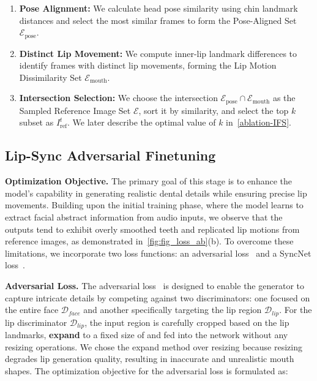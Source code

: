 \begin{enumerate}
\item \textbf{Pose Alignment:} We calculate head pose similarity using chin landmark distances and select the most similar frames to form the Pose-Aligned Set \(\mathcal{E}_{\text{pose}}\). 

\item \textbf{Distinct Lip Movement:} We compute inner-lip landmark differences to identify frames with distinct lip movements, forming the Lip Motion Dissimilarity Set \(\mathcal{E}_{\text{mouth}}\). 

\item \textbf{Intersection Selection:} We choose the intersection \(\mathcal{E}_{\text{pose}} \cap \mathcal{E}_{\text{mouth}}\) as the Sampled Reference Image Set \(\mathcal{E}\), sort it by similarity, and select the top \(k\) subset as \(I^{t}_{\text{ref}}\). 
We later describe the optimal value of \(k\) in~\cref{ablation-IFS}. 
\end{enumerate}


\subsection{Lip-Sync Adversarial Finetuning}
\label{subsec:method_4}
\noindent \textbf{Optimization Objective.}
The primary goal of this stage is to enhance the model's capability in generating realistic dental details while ensuring precise lip movements. Building upon the initial training phase, where the model learns to extract facial abstract information from audio inputs, we observe that the outputs tend to exhibit overly smoothed teeth and replicated lip motions from reference images, as demonstrated in~\cref{fig:fig_loss_ab}(b). 
To overcome these limitations, we incorporate two loss functions: an adversarial loss~\cite{mao2017least} and a SyncNet loss~\cite{prajwal2020lip}.

\noindent \textbf{Adversarial Loss.}
The adversarial loss~\cite{gulrajani2017improved} is designed to enable the generator to capture intricate details by competing against two discriminators: one focused on the entire face \( \mathcal D_{face}\) and another specifically targeting the lip region \( \mathcal D_{lip}\). For the lip discriminator \( \mathcal D_{lip}\), the input region is carefully cropped based on the lip landmarks, \textbf{expand} to a fixed size of and fed into the network without any resizing operations. 
We chose the expand method over resizing because resizing degrades lip generation quality, resulting in inaccurate and unrealistic mouth shapes.
The optimization objective for the adversarial loss is formulated as:

